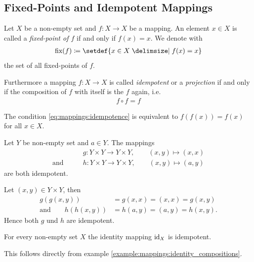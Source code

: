 \subsection{Fixed-Points and Idempotent Mappings}

\begin{definition}
    Let $X$ be a non-empty set and $f\colon X\rightarrow X$ be a mapping. An element $x\in X$ is called a \emph{fixed-point of $f$} if and only if $f(x)=x$. We denote with
    \begin{align}\fixset(f)\coloneq\setdef{x\in X\given f(x)=x}\end{align} the set of all fixed-points of $f$.
    
    Furthermore a mapping $f\colon X\rightarrow X$ is called \emph{idempotent} or a \emph{projection} if and only if the composition of $f$ with itself is the $f$ again, i.e. \begin{align}f\circ f=f\label{eq:mappings:idempotence}\end{align}
\end{definition}

\begin{remarks}
    \begin{remarkenumerate}
        \item The condition \ref{eq:mappings:idempotence} is equivalent to $f(f(x))=f(x)$ for all $x\in X$.
    \end{remarkenumerate}
\end{remarks}

\begin{examples}
    \begin{exampleenumerate}
        \item Let $Y$ be non-empty set and $a\in Y$. The mappings \begin{align}& g\colon Y\times Y\rightarrow Y\times Y,\qquad (x,y)\mapsto (x,x)\\\text{and}\qquad& h\colon Y\times Y\rightarrow Y\times Y,\qquad (x,y)\mapsto (a,y)\end{align} are both idempotent.
        \begin{miniproof}
            Let $(x,y)\in Y\times Y$, then
            \begin{align}
                g(g(x,y))&=g(x,x)=(x,x)=g(x,y)\\
                \text{and}\qquad
                h(h(x,y))&=h(a,y)=(a,y)=h(x,y).
            \end{align}
            Hence both $g$ und $h$ are idempotent.
        \end{miniproof}
        \item For every non-empty set $X$ the identity mapping $\text{id}_X$ is idempotent.
        \begin{miniproof}
            This follows directly from example \ref{example:mappings:identity_compositions}.
        \end{miniproof}
    \end{exampleenumerate}
\end{examples}

